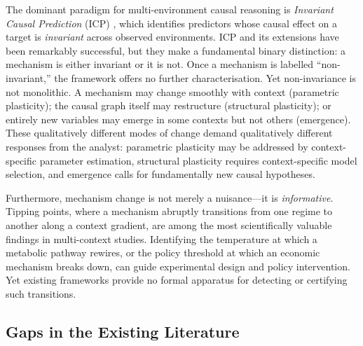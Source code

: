 \documentclass[11pt,a4paper]{article}
\theoremstyle{definition}
\begin{document}
The dominant paradigm for multi-environment causal reasoning is
\emph{Invariant Causal Prediction} (ICP)
\citep{peters2016causal,heinzedeml2018invariant}, which identifies
predictors whose causal effect on a target is \emph{invariant} across
observed environments.  ICP and its extensions
\citep{pfister2019invariant,rothenhausler2021anchor} have been remarkably
successful, but they make a fundamental binary distinction: a mechanism is
either invariant or it is not.  Once a mechanism is labelled
``non-invariant,'' the framework offers no further characterisation.  Yet
non-invariance is not monolithic.  A mechanism may change smoothly with
context (parametric plasticity); the causal graph itself may restructure
(structural plasticity); or entirely new variables may emerge in some
contexts but not others (emergence).  These qualitatively different modes
of change demand qualitatively different responses from the analyst:
parametric plasticity may be addressed by context-specific parameter
estimation, structural plasticity requires context-specific model
selection, and emergence calls for fundamentally new causal hypotheses.

Furthermore, mechanism change is not merely a nuisance---it is
\emph{informative}.  Tipping points, where a mechanism abruptly
transitions from one regime to another along a context gradient, are among
the most scientifically valuable findings in multi-context studies.
Identifying the temperature at which a metabolic pathway rewires, or the
policy threshold at which an economic mechanism breaks down, can guide
experimental design and policy intervention.  Yet existing frameworks
provide no formal apparatus for detecting or certifying such transitions.

\subsection{Gaps in the Existing Literature}
\end{document}
